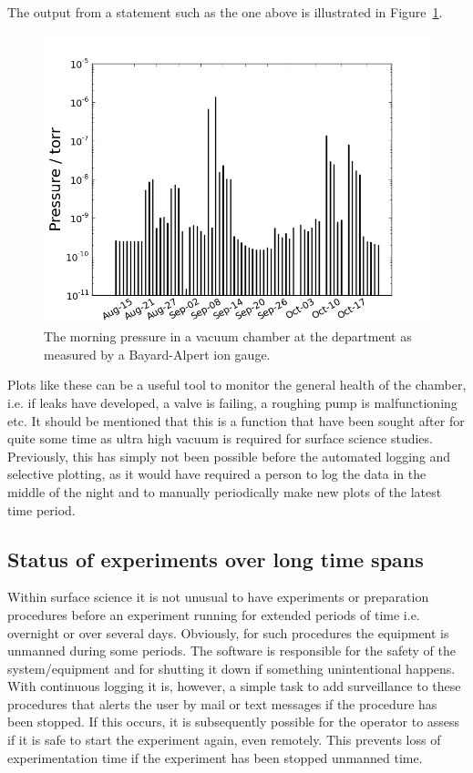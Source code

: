 The output from a statement such as the one above is illustrated in
Figure~\ref{fig:morning_pressure}.
\begin{figure}
 \begin{center} 
  \includegraphics[width=12cm]{morning_pressure.png} 

\caption{The morning pressure in a vacuum chamber at the department as measured
 by a Bayard-Alpert ion gauge.\label{fig:morning_pressure}} 
\end{center}
\end{figure} 
Plots like these can be a useful tool to monitor the general health of the
chamber, i.e. if leaks have developed, a valve is failing, a roughing pump is
malfunctioning etc. It should be mentioned that this is a function that have
been sought after for quite some time as ultra high vacuum is required for
surface science studies. Previously, this has simply not been possible before
the automated logging and selective plotting, as it would have required a
person to log the data in the middle of the night and to manually periodically
make new plots of the latest time period.

\subsection{Status of experiments over long time spans} 
Within surface science it is not unusual to have experiments or preparation
procedures before an experiment running for extended periods of time i.e.
overnight or over several days. Obviously, for such procedures the equipment is
unmanned during some periods. The software is responsible for the safety of the
system/equipment and for shutting it down if something unintentional happens.
With continuous logging it is, however, a simple task to add surveillance to
these procedures that alerts the user by mail or text messages if the procedure
has been stopped. If this occurs, it is subsequently possible for the operator
to assess if it is safe to start the experiment again, even remotely. This
prevents loss of experimentation time if the experiment has been stopped
unmanned time.

